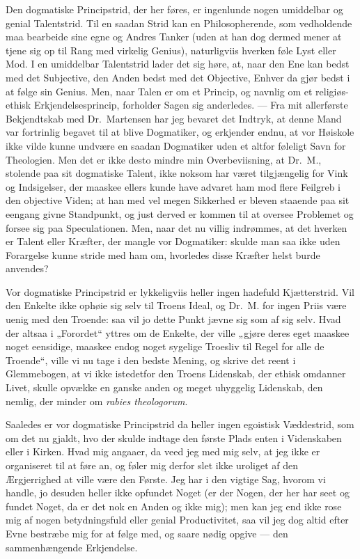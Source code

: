 Den dogmatiske Principstrid, der her føres, er ingenlunde nogen
umiddelbar og genial Talentstrid. Til en saadan Strid kan en
Philosopherende, som vedholdende maa bearbeide sine egne og Andres
Tanker (uden at han dog dermed mener at tjene sig op til Rang med
virkelig Genius), naturligviis hverken føle Lyst eller Mod. I en
umiddelbar Talentstrid lader det sig høre, at, naar den Ene kan
bedst med det Subjective, den Anden bedst med det Objective,
Enhver da gjør bedst i at følge sin Genius. Men, naar Talen er om
et Princip, og navnlig om et religiøs-ethisk Erkjendelsesprincip,
forholder Sagen sig anderledes. --- Fra mit allerførste
Bekjendtskab med Dr.\ Martensen har jeg bevaret det Indtryk, at
denne Mand var fortrinlig begavet til at blive Dogmatiker, og
erkjender endnu, at vor Høiskole ikke vilde
 kunne undvære en saadan Dogmatiker uden et altfor føleligt Savn
for Theologien. Men det er ikke desto mindre min Overbeviisning,
at Dr.\ M., stolende paa sit dogmatiske Talent, ikke noksom har
været tilgjængelig for Vink og Indsigelser, der maaskee ellers
kunde have advaret ham mod flere Feilgreb i den objective Viden;
at han med vel megen Sikkerhed er bleven staaende paa sit eengang
givne Standpunkt, og just derved er kommen til at oversee
Problemet og forsee sig paa Speculationen. Men, naar det nu villig
indrømmes, at det hverken er Talent eller Kræfter, der mangle vor
Dogmatiker: skulde man saa ikke uden Forargelse kunne stride med
ham om, hvorledes disse Kræfter helst burde anvendes?

Vor dogmatiske Principstrid er lykkeligviis heller ingen hadefuld
Kjætterstrid. Vil den Enkelte ikke ophøie sig selv til Troens
Ideal, og Dr.\ M. for ingen Priis være uenig med den Troende: saa
vil jo dette Punkt jævne sig som af sig selv. Hvad der altsaa i
„Forordet“ yttres om de Enkelte, der ville „gjøre deres eget
maaskee noget eensidige, maaskee endog noget sygelige Troesliv til
Regel for alle de Troende“, ville vi nu tage i den bedste Mening,
og skrive det reent i Glemmebogen, at vi ikke istedetfor den
Troens Lidenskab, der ethisk omdanner Livet, skulle opvække en
ganske anden og meget uhyggelig Lidenskab, den nemlig, der minder
om \textit{rabies theologorum}.

Saaledes er vor dogmatiske Principstrid da heller ingen egoistisk
Væddestrid, som om det nu gjaldt,
 hvo der skulde indtage den første Plads enten i Videnskaben eller
i Kirken. Hvad mig angaaer, da veed jeg med mig selv, at jeg ikke
er organiseret til at føre an, og føler mig derfor slet ikke
uroliget af den Ærgjerrighed at ville være den Første. Jeg har i
den vigtige Sag, hvorom vi handle, jo desuden heller ikke opfundet
Noget (er der Nogen, der her har seet og fundet Noget, da er det
nok en Anden og ikke mig); men kan jeg end ikke rose mig af nogen
betydningsfuld eller genial Productivitet, saa vil jeg dog altid
efter Evne bestræbe mig for at følge med, og saare nødig opgive
--- den sammenhængende Erkjendelse.

